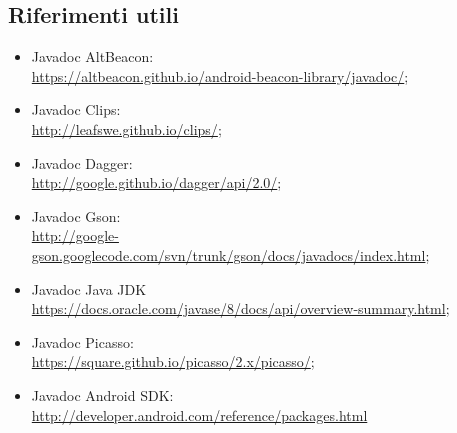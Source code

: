 \documentclass[../ManualeSviluppatore.tex]{subfiles}
\begin{document}
	
	\subsection{Riferimenti utili}
		\begin{itemize}
			\item Javadoc AltBeacon: \\ \url{https://altbeacon.github.io/android-beacon-library/javadoc/};
			\item Javadoc Clips: \\ \url{http://leafswe.github.io/clips/};
			\item Javadoc Dagger: \\ \url{http://google.github.io/dagger/api/2.0/};
			\item Javadoc Gson: \\ \url{http://google-gson.googlecode.com/svn/trunk/gson/docs/javadocs/index.html};
			\item Javadoc Java JDK \\ \url{https://docs.oracle.com/javase/8/docs/api/overview-summary.html};
			\item Javadoc Picasso: \\ \url{https://square.github.io/picasso/2.x/picasso/};
			\item Javadoc Android SDK: \\ \url{http://developer.android.com/reference/packages.html}

		\end{itemize}
\end{document}
